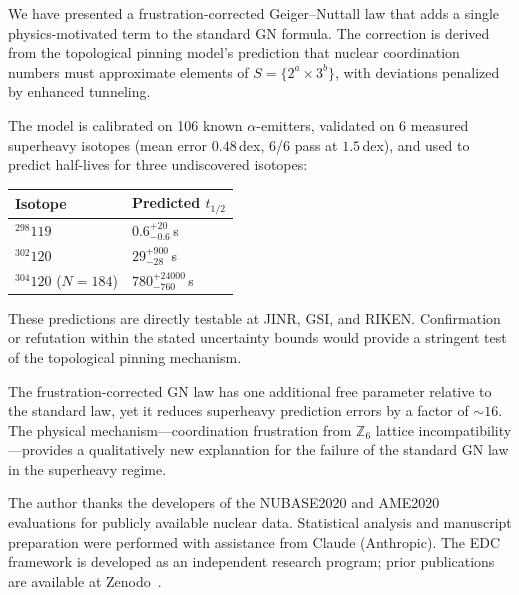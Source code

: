 \documentclass[aps,prc,twocolumn,showpacs,preprintnumbers,amsmath,amssymb]{revtex4-2}
\newcommand{\thalf}{t_{1/2}}
\begin{document}
We have presented a frustration-corrected Geiger--Nuttall law
that adds a single physics-motivated term to the standard GN
formula.  The correction is derived from the topological pinning
model's prediction that nuclear coordination numbers must
approximate elements of $S = \{2^a \times 3^b\}$, with
deviations penalized by enhanced tunneling.

The model is calibrated on 106 known $\alpha$-emitters,
validated on 6 measured superheavy isotopes (mean error
$0.48$\,dex, 6/6 pass at $1.5$\,dex), and used to predict
half-lives for three undiscovered isotopes:

\begin{center}
\begin{tabular}{@{}ll@{}}
\toprule
Isotope & Predicted $\thalf$ \\
\midrule
${}^{298}119$ & $0.6^{+20}_{-0.6}$\,s \\
${}^{302}120$ & $29^{+900}_{-28}$\,s \\
${}^{304}120$ ($N=184$) & $780^{+24000}_{-760}$\,s \\
\bottomrule
\end{tabular}
\end{center}

These predictions are directly testable at JINR, GSI, and
RIKEN.  Confirmation or refutation within the stated
uncertainty bounds would provide a stringent test of the
topological pinning mechanism.

The frustration-corrected GN law has one additional free
parameter relative to the standard law, yet it reduces
superheavy prediction errors by a factor of $\sim 16$.
The physical mechanism---coordination frustration from
$\mathbb{Z}_6$ lattice incompatibility---provides a
qualitatively new explanation for the failure of the
standard GN law in the superheavy regime.

\begin{acknowledgments}
The author thanks the developers of the NUBASE2020 and
AME2020 evaluations for publicly available nuclear data.
Statistical analysis and manuscript preparation were
performed with assistance from Claude (Anthropic).
The EDC framework is developed as an independent
research program; prior publications are available at
Zenodo~\cite{EDCPartI,EDCPaper2}.
\end{acknowledgments}
\end{document}
